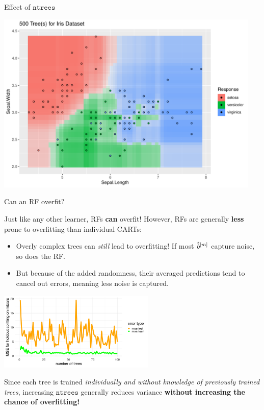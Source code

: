 \documentclass[11pt,compress,t,notes=noshow, xcolor=table]{beamer}
\begin{document}
\begin{vbframe}{Effect of $\texttt{ntrees}$}
\begin{knitrout}
{\centering \includegraphics[width=0.95\textwidth]{figure/cart_forest_intro_3} 

}
\end{knitrout}
\end{vbframe}

\begin{vbframe}{Can an RF overfit? }

{\small
Just like any other learner, RFs \textbf{can} overfit! However, RFs are generally \textbf{less} prone to overfitting than individual CARTs:
\begin{itemize}
  \item Overly complex trees can \textit{still} lead to overfitting! If most $\hat{b}^{[m]}$ capture noise, so does the RF.
  \item But because of the added randomness, their averaged predictions tend to cancel out errors, meaning less noise is captured.
\end{itemize}

\begin{center}
\includegraphics[width=0.56\textwidth]{figure/forest-overfit.png}
\end{center}

Since each tree is trained \textit{individually and without knowledge of previously trained trees}, increasing $\texttt{ntrees}$ generally reduces variance \textbf{without increasing the chance of overfitting!}
}
\end{vbframe}
\end{document}
